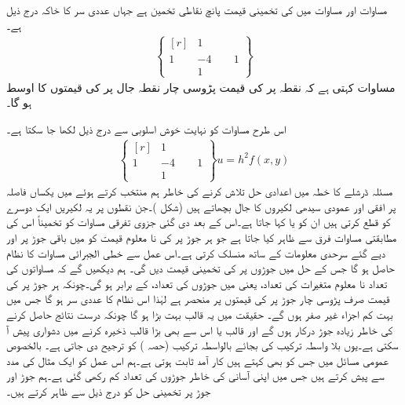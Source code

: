 مساوات  اور مساوات  میں  کی تخمینی قیمت پانچ نقاطی تخمین ہے جہاں  عددی سر کا خاکہ درج ذیل ہے۔
\begin{align}\label{مساوات_اعدادی_جزوی_عمومی_ح}
\left \{ \begin{matrix*}[r] &1&\\1&-4&\phantom{-}1\\&1& \end{matrix*}\right \}
\end{align}
مساوات  کہتی ہے کہ نقطہ  پر  کی قیمت  پڑوسی چار نقطہ جال پر  کی قیمتوں کا اوسط ہو گا۔

اس طرح مساوات  کو نہایت خوش اسلوبی سے درج ذیل لکھا جا سکتا ہے۔ 
\begin{align*}
\left \{ \begin{matrix*}[r] &1&\\1&-4&\phantom{-}1\\&1& \end{matrix*}\right \}u=h^2f(x,y)
\end{align*}
مسئلہ ڈرشلے  کا خطہ  میں اعدادی حل تلاش کرنے کی خاطر  ہم  منتخب کرتے ہوئے  میں  یکساں  فاصلہ پر افقی اور عمودی سیدھی لکیروں کا جال بچھاتے ہیں (شکل )۔جن نقطوں پر یہ لکیریں ایک دوسرے کو قطع کرتی ہیں ان  کو   یا  کہا جاتا ہے۔اس کے بعد دی گئی جزوی تفرقی مساوات کو تخمیناً اس کی مطابقتی مساوات فرق سے ظاہر کیا جاتا ہے جو ہر جوڑ پر  کی نا معلوم قیمت کو  میں باقی جوڑ پر اور دیے گئے سرحدی معلومات کے ساتھ منسلک کرتی ہے۔اس عمل سے خطی الجبرائی مساوات کا نظام حاصل ہو گا جس کے حل  میں  جوڑوں پر  کی تخمینی قیمت دیں گی۔ ہم دیکھیں گے کہ مساواتوں کی تعداد نا معلوم متغیرات کی تعداد، یعنی  میں جوڑوں کی تعداد، کے برابر ہو گی۔چونکہ ہر جوڑ پر  کی قیمت صرف پڑوسی چار جوڑ پر  کی قیمتوں پر منحصر ہے لہٰذا اس نظام کا عددی سر  ہو گا جس میں بہت کم اجزاء غیر صفر ہوں گے۔ حقیقت میں یہ قالب بہت بڑا ہو گا چونکہ درست نتائج حاصل کرنے کی خاطر زیادہ جوڑ درکار ہوں گے اور  قالب یا اس سے بھی بڑا قالب ذخیرہ کرنے میں دشواری پیش آ سکتی ہے۔یوں بلا واسطہ ترکیب کی بجائے  بالواسطہ ترکیب (حصہ ) کو ترجیح دی جاتی ہے۔ بالخصوص عمومی مسائل میں   جس کو  بھی کہتے ہیں کار آمد ثابت ہوتی ہے۔ہم اس عمل کو ایک مثال کی مدد سے پیش کرتے ہیں جس میں اپنی  آسانی کی خاطر جوڑوں کی تعداد کم رکھی گئی ہے۔ہم جوڑ اور جوڑ پر تخمینی حل کو درج ذیل سے ظاہر کرتے ہیں۔
